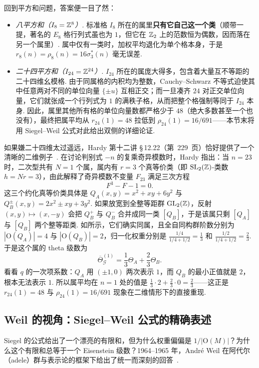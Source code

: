 回到平方和问题，答案便一目了然：
\begin{itemize}
\item \emph{八平方和（$I_8=\mathbb{Z}^8$）.} 标准格 $I_8$ 所在的属里\textbf{只有它自己这一个类}（顺带一提，著名的 $E_8$ 格行列式虽也为 $1$，但它在 $\mathbb{Z}_2$ 上的范数恒为偶数，因而落在另一个属里）. 属中仅有一类时，加权平均退化为单个格本身，于是 $r_8(n)=\rho_8(n)=16\sigma_3^*(n)$ 毫无误差.
\item \emph{二十四平方和（$I_{24}=\mathbb{Z}^{24}$）.} $I_{24}$ 所在的属庞大得多，包含着大量互不等距的二十四维幺模格. 由于同属格的内积均为整数，Cauchy--Schwarz 不等式迫使其中任意两对不同的单位向量 $\{\pm u\}$ 互相正交；而一旦凑齐 $24$ 对正交单位向量，它们就张成一个行列式为 $1$ 的满秩子格，从而把整个格强制等同于 $I_{24}$ 本身. 因此，属里其他所有格的单位向量数都严格少于 $48$（绝大多数甚至一个也没有），最终把属平均从 $r_{24}(1)=48$ 拉低到 $\rho_{24}(1)=16/691$——本节末将用 Siegel--Weil 公式对此给出双侧的详细论证.
\end{itemize}

如果嫌二十四维太过遥远，Hardy 第十二讲 \S\,12.22（第~229~页）恰好提供了一个清晰的二维例子~\cite{Hardy1940}. 在讨论判别式 $-n$ 的复乘奇异模数时，Hardy 指出：当 $n=23$ 时，二次型共有 $N=1$ 个属，属内有 $r=3$ 个真等价类（即 $\operatorname{SL}_2(\mathbb{Z})$-类数 $h=Nr=3$），由此解释了奇异模数不变量 $F_{23}$ 满足三次方程
\[
F^3-F-1=0.
\]
这三个约化真等价类具体是 $Q_A(x,y)=x^2+xy+6y^2$ 与 $Q_B^\pm(x,y)=2x^2\pm xy+3y^2$. 如果放宽到全整等距群 $\operatorname{GL}_2(\mathbb{Z})$，反射 $(x,y)\mapsto(x,-y)$ 会把 $Q_B^+$ 与 $Q_B^-$ 合并成同一类 $[Q_B]$，于是该属只剩 $[Q_A]$ 与 $[Q_B]$ 两个整等距类. 如所示，它们确实同属，且全自同构群阶数分别为 $|\mathrm O(Q_A)|=4$ 与 $|\mathrm O(Q_B)|=2$，归一化权重分别是 $\frac{1/4}{1/4+1/2}=\frac{1}{3}$ 和 $\frac{1/2}{1/4+1/2}=\frac{2}{3}$. 于是这个属的 theta 级数为
\[
\overline{\Theta}_{\mathcal G}^{(1)}=\frac{1}{3}\Theta_A+\frac{2}{3}\Theta_B.
\]
看看 $q$ 的一次项系数：$Q_A$ 用 $(\pm 1,0)$ 两次表示 $1$，而 $Q_B$ 的最小正值就是 $2$，根本无法表示 $1$. 所以属平均在 $n=1$ 处的值是 $\frac{1}{3}\cdot 2+\frac{2}{3}\cdot 0=\frac{2}{3}$——这正是 $r_{24}(1)=48$ 与 $\rho_{24}(1)=16/691$ 现象在二维情形下的直接重现.

\subsection{Weil 的视角：Siegel--Weil 公式的精确表述}

Siegel 的公式给出了一个漂亮的有限和，但为什么权重偏偏是 $1/|\mathrm O(M)|$？为什么这个有限和总等于一个 Eisenstein 级数？1964--1965 年，André Weil 在阿代尔（adele）群与表示论的框架下给出了统一而深刻的回答~\cite{Weil1964,Weil1965,Li2023}.

